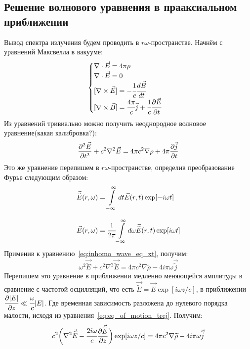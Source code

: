 \documentclass[14pt,a4paper]{extarticle}
\numberwithin{equation}{section}
\begin{document}
\subsection{Решение волнового уравнения в прааксиальном приближении}
Вывод спектра излучения будем проводить в $r\omega$-пространстве. Начнём с уравнений Максвелла в вакууме:
\begin{equation}
	\begin{cases}
		\nabla \cdot \vec{E} = 4\pi \rho\\
		\nabla \cdot \vec{E} = 0\\
		[\nabla \times \vec{E}] = -\cfrac{1}{c} \cfrac{d\vec{B}}{dt}\\
		[\nabla \times \vec{B}] = \cfrac{4\pi}{c} \vec{j} + \cfrac{1}{c} \cfrac{\partial\vec{E}}{\partial t}
	\end{cases} 
\end{equation}
Из уравнений тривиально можно получить неоднородное волновое уравнение(какая калибровка?): 
\begin{equation}
	\label{eq:inhomo_wave_eq_xt}
	\pdv[2]{\vec{E}}{t} + c^2 \nabla^2 \vec{E} = 4\pi c^2 \nabla \rho + 4\pi \pdv{\vec{j}}{t}
\end{equation}
Это же уравнение перепишем в $r\omega$-пространстве, определив преобразование Фурье следующим образом:
\begin{equation}
	\label{eq:Fourier_wt}
	\begin{array}{lcl}
		\vec{\widetilde{E}}(r, \omega) = \displaystyle\int\limits_{-\infty}^{\infty} dt \vec{E}(r, t)\exp[-i\omega t]\\
		\\
		\vec{E}(r, \omega) = \cfrac{1}{2\pi}\displaystyle\int\limits_{-\infty}^{\infty} d\omega \vec{\widetilde{E}}(r, t)\exp[i\omega t]
	\end{array}
\end{equation}
Применив к уравнению~\ref{eq:inhomo_wave_eq_xt}, получим:
\begin{equation}
	\omega^2 \vec{\widetilde{E}} + c^2 \nabla^2 \vec{\widetilde{E}} = 4\pi c^2 \nabla  \widetilde{\rho} - 4i\pi\omega\vec{\widetilde{j}}
\end{equation}
Перепишем это уравнение в приближении медленно меняющейся амплитуды в сравнение с частотой осцилляций, что есть $\vec{\widetilde{E}} =  \vec{\overline{E}}\exp[i\omega z/c]$, в приближении $\cfrac{\partial |E|}{\partial z} \ll \cfrac{\omega}{c}|E|$. Где временная зависимость разложена до нулевого порядка малости, исходя из уравнения~\ref{eq:eq_of_motion_trej}. Получим:
\begin{equation}
	\label{eq:wave_slow_vary}
	c^2\bigg(\nabla^2 \vec{\widetilde{E}} - \cfrac{2i\omega}{c}\pdv{\vec{\widetilde{E}}}{z}\bigg)\exp[i\omega z/c] = 4\pi c^2 \nabla  \widetilde{\rho} - 4i\pi\omega\vec{\widetilde{j}}
\end{equation}
\end{document}
